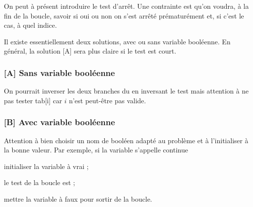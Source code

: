 On peut à présent introduire le test d'arrêt.
Une contrainte est qu'on voudra, à la fin de la boucle, savoir
si oui ou non on s'est arrêté prématurément et, si c'est le cas,
à quel indice.

Il existe essentiellement deux solutions, avec ou sans variable booléenne.
En général, la solution [A] sera plus claire si le test est court.

\subsubsection*{[A] Sans variable booléenne}


On pourrait inverser les deux branches du  en inversant le test
mais attention à ne pas tester tab[i] car $i$ n'est peut-être pas valide.

\subsubsection*{[B] Avec variable booléenne}


Attention à bien choisir un nom de booléen adapté au problème
et à l'initialiser à la bonne valeur. 
Par exemple, si la variable s'appelle \og{}continue\fg{}
\begin{liste}
\item initialiser la variable à vrai ;
\item le test de la boucle est \og{}\fg{} ;
\item mettre la variable à faux pour sortir de la boucle.
\end{liste}

